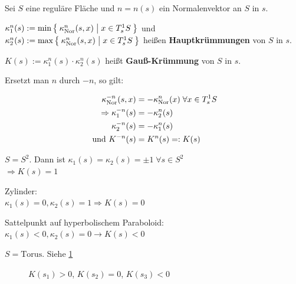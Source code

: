 \begin{definition}%
    Sei $S$ eine reguläre Fläche und $n=n(s)$ ein Normalenvektor an 
    $S$ in $s$.

    \begin{defenum}
        \item $\kappa^n_1(s) := \min \Set{\kappa_{\textnormal{Nor}}^n(s,x) | x \in T_s^1 S}$ und\\
              $\kappa^n_2(s) := \max \Set{\kappa_{\textnormal{Nor}}^n(s,x) | x \in T_s^1 S}$
              heißen \textbf{Hauptkrümmungen} von $S$ in $s$.
        \item $K(s) := \kappa_1^n(s) \cdot \kappa_2^n(s)$ heißt
              \textbf{Gauß-Krümmung} von $S$ in $s$.
    \end{defenum}
\end{definition}

\begin{bemerkung}%
    Ersetzt man $n$ durch $-n$, so gilt: 

    \begin{align*}
                \kappa_{\textnormal{Nor}}^{-n}(s, x) &= - \kappa_{\textnormal{Nor}}^n(x)\; \forall x \in T_s^1 S\\
        \Rightarrow \kappa_1^{-n}(s) &= - \kappa_2^n(s)\\
                    \kappa_2^{-n}(s) &= - \kappa_1^n (s)\\
              \text{ und } K^{-n}(s) &= K^n(s) =: K(s)
    \end{align*}
\end{bemerkung}

\begin{beispiel}
    \begin{bspenum}
        \item $S = S^2$. Dann ist $\kappa_1(s) = \kappa_2(s) = \pm 1\;\forall s \in S^2$\\
              $\Rightarrow K(s) = 1$
        \item Zylinder:\\
              $\kappa_1(s) = 0, \kappa_2(s) = 1 \Rightarrow K(s) = 0$
        \item Sattelpunkt auf hyperbolischem Paraboloid:\\
              $\kappa_1(s) < 0, \kappa_2(s) = 0 \rightarrow K(s) < 0$
        \item $S = \text{Torus}$. Siehe \cref{fig:torus-gauss-kruemmung}\\
            \begin{figure}[htp]
                \centering
                 
                \caption{$K(s_1) > 0$, $K(s_2) = 0$, $K(s_3) < 0$}
                \label{fig:torus-gauss-kruemmung}
            \end{figure}
    \end{bspenum}
\end{beispiel}

